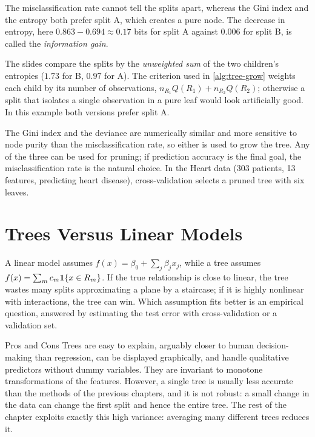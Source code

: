 \noindent The misclassification rate cannot tell the splits apart, whereas the Gini index and the entropy both prefer split A, which creates a pure node. The decrease in entropy, here $0.863-0.694\approx0.17$ bits for split A against $0.006$ for split B, is called the \emph{information gain}.

\begin{remark}
The slides compare the splits by the \emph{unweighted sum} of the two children's entropies ($1.73$ for B, $0.97$ for A). The criterion used in \cref{alg:tree-grow} weights each child by its number of observations, $n_{R_1}Q(R_1)+n_{R_2}Q(R_2)$; otherwise a split that isolates a single observation in a pure leaf would look artificially good. In this example both versions prefer split A.
\end{remark}

The Gini index and the deviance are numerically similar and more sensitive to node purity than the misclassification rate, so either is used to grow the tree. Any of the three can be used for pruning; if prediction accuracy is the final goal, the misclassification rate is the natural choice. In the Heart data (303 patients, 13 features, predicting heart disease), cross-validation selects a pruned tree with six leaves.

\section{Trees Versus Linear Models}\label{sec:trees-vs-linear}

A linear model assumes $f(x)=\beta_0+\sum_j\beta_jx_j$, while a tree assumes $f(x)=\sum_mc_m\mathbf{1}\{x\in R_m\}$. If the true relationship is close to linear, the tree wastes many splits approximating a plane by a staircase; if it is highly nonlinear with interactions, the tree can win. Which assumption fits better is an empirical question, answered by estimating the test error with cross-validation or a validation set.

\begin{notebox}{Pros and Cons}
Trees are easy to explain, arguably closer to human decision-making than regression, can be displayed graphically, and handle qualitative predictors without dummy variables. They are invariant to monotone transformations of the features. However, a single tree is usually less accurate than the methods of the previous chapters, and it is not robust: a small change in the data can change the first split and hence the entire tree. The rest of the chapter exploits exactly this high variance: averaging many different trees reduces it.
\end{notebox}


